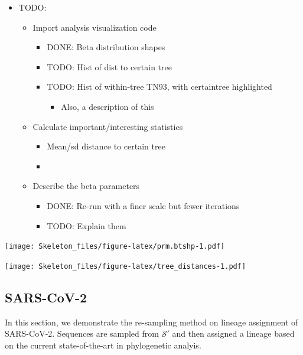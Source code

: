 \documentclass[
]{article}
\providecommand{\tightlist}{%
  \setlength{\itemsep}{0pt}\setlength{\parskip}{0pt}}
\newcommand{\nps}{\mathcal{S}} %
\begin{document}
\begin{itemize}
\tightlist
\item
  TODO:

  \begin{itemize}
  \tightlist
  \item
    Import analysis visualization code

    \begin{itemize}
    \tightlist
    \item
      DONE: Beta distribution shapes
    \item
      TODO: Hist of dist to certain tree
    \item
      TODO: Hist of within-tree TN93, with certaintree highlighted

      \begin{itemize}
      \tightlist
      \item
        Also, a description of this
      \end{itemize}
    \end{itemize}
  \item
    Calculate important/interesting statistics

    \begin{itemize}
    \tightlist
    \item
      Mean/sd distance to certain tree
    \item
    \end{itemize}
  \item
    Describe the beta parameters

    \begin{itemize}
    \tightlist
    \item
      DONE: Re-run with a finer scale but fewer iterations
    \item
      TODO: Explain them
    \end{itemize}
  \end{itemize}
\end{itemize}

\texttt{[image: Skeleton\_files/figure-latex/prm.btshp-1.pdf]}

\texttt{[image: Skeleton\_files/figure-latex/tree\_distances-1.pdf]}

\hypertarget{sars-cov-2}{%
\subsection{SARS-CoV-2}\label{sars-cov-2}}

In this section, we demonstrate the re-sampling method on lineage
assignment of SARS-CoV-2. Sequences are sampled from \(\nps'\) and then
assigned a lineage based on the current state-of-the-art in phylogenetic
analyis.
\end{document}

